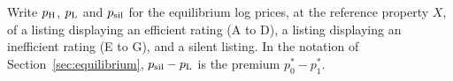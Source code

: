 Write $p_{\rm H}$, $p_{\rm L}$ and $p_{\rm sil}$ for the equilibrium log prices, at the reference property $X$, of a listing displaying an efficient rating (A to D), a listing displaying an inefficient rating (E to G), and a silent listing. In the notation of Section~\ref{sec:equilibrium}, $p_{\rm sil}-p_{\rm L}$ is the premium $p_0^*-p_1^*$.

